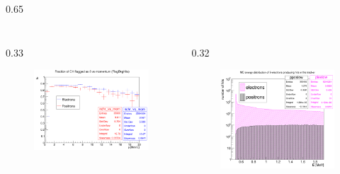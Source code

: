 \documentclass{beamer}
\begin{document}
\begin{frame}
\begin{columns}
\begin{column}{0.65\framewidth}
\begin{table}[h!]
\begin{tabular}{| l | c | c | c |}
    \end{tabular}
    \label{tab:2bbcele}
    \end{table}
    \begin{columns}
        \begin{column}{0.33\framewidth}
    \begin{figure}[!h]
        \centering
        \hspace*{-1em}
        \includegraphics[width =1.2\columnwidth]{figures/png/Screenshot_20240818_155835.png}
       \label{fig:0pbarbefore}
\end{figure}
\end{column}
  \begin{column}{0.32\framewidth}
    \begin{figure}[!h]
        \centering
                    \hspace*{-0.2em}
        \includegraphics[width =1.\columnwidth]{figures/png/Screenshot_20240820_154854.png}
       \label{fig:0pbarbefore}
\end{figure}
        \end{column}
    \end{columns}
\end{column}
\end{columns}


\end{frame}
\end{document}
